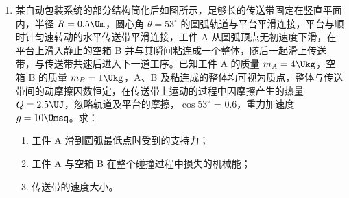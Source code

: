 \documentclass[\gkver]{gaokaozhenti}
\begin{document}
\begin{enumerate}

\item
某自动包装系统的部分结构简化后如图所示，足够长的传送带固定在竖直平面内，半径 $R = 0.5 \Um$，圆心角 $\theta = 53^\circ$ 的圆弧轨道与平台平滑连接，平台与顺时针匀速转动的水平传送带平滑连接，工件 A 从圆弧顶点无初速度下滑，在平台上滑入静止的空箱 B 并与其瞬间粘连成一个整体，随后一起滑上传送带，与传送带共速后进入下一道工序。已知工件 A 的质量 $m_{A} = 4 \Ukg$，空箱 B 的质量 $m_{B} = 1 \Ukg$，A、B 及粘连成的整体均可视为质点，整体与传送带间的动摩擦因数恒定，在传送带上运动的过程中因摩擦产生的热量 $Q = 2.5 \UJ$，忽略轨道及平台的摩擦，$\cos 53^\circ$ = 0.6，重力加速度 $g = 10 \Umsq$。求：

\begin{enumerate}
	\item
	工件 A 滑到圆弧最低点时受到的支持力；
	\item
	工件 A 与空箱 B 在整个碰撞过程中损失的机械能；
	\item
	传送带的速度大小。
\end{enumerate}


\end{enumerate}
\end{document}
